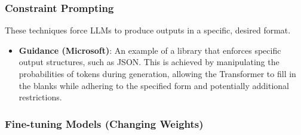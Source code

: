 \subsubsection{Constraint Prompting}

These techniques force LLMs to produce outputs in a specific, desired format.
\begin{itemize}
    \item \textbf{Guidance (Microsoft)}: An example of a library that enforces specific output structures, such as JSON. This is achieved by manipulating the probabilities of tokens during generation, allowing the Transformer to fill in the blanks while adhering to the specified form and potentially additional restrictions.
\end{itemize}

\subsubsection{Fine-tuning Models (Changing Weights)}

